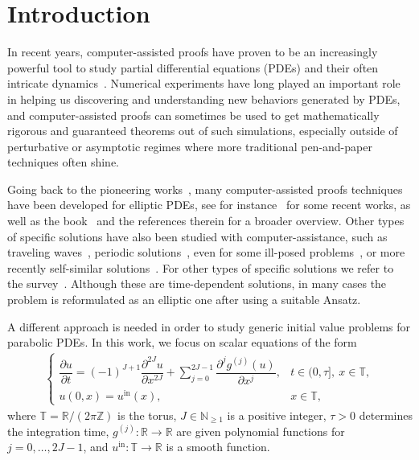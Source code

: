 \documentclass[10pt,a4paper]{article}
\theoremstyle{plain}
\newcommand{\RR}{\mathbb R}
\newcommand{\ZZ}{\mathbb Z}
\newcommand{\TT}{\mathbb T}
\newcommand{\NN}{\mathbb N}
\newcommand{\1}{\mathbf{1}}
\newcommand{\uin}{{u^{\mathrm{in}}}}
\begin{document}


\section{Introduction}
\label{sec:introduction}

In recent years, computer-assisted proofs have proven to be an increasingly powerful tool to study partial differential equations (PDEs) and their often intricate dynamics~\cite{BerLes15}. Numerical experiments have long played an important role in helping us
discovering and understanding new behaviors generated by PDEs, and computer-assisted proofs can sometimes be used to get mathematically rigorous and guaranteed theorems out of such simulations, especially outside of perturbative or asymptotic regimes where more traditional pen-and-paper techniques often shine. 

Going back to the pioneering works~\cite{Nak88,Plu92}, many computer-assisted proofs techniques have been developed for elliptic PDEs, see for instance~\cite{BerWil19,AriGazKoc21,LiuNakOis22,Wun22,CadLesNav24} for some recent works, as well as the book~\cite{NakPluWat19} and the references therein for a broader overview. Other types of specific solutions have also been studied with computer-assistance, such as traveling waves~\cite{AriKoc15,BreHorMcKPlu06,BerBreLesMur18,EncGomVer18,BerShe20,Cad24}, periodic solutions~\cite{Zgl04,AriKoc10bis,GamLes17,FigLla17,BerBreLesVee21}, even for some ill-posed problems~\cite{CasGamLes18}, or more recently self-similar solutions~\cite{BucCaoGom22,CheHou25,BreChu24,DahFig24,DonSch24,HouWanYan25}. For other types of specific solutions we refer to the survey~\cite{Gom19}. Although these are time-dependent solutions, in many cases the problem is reformulated as an elliptic one after using a suitable Ansatz.

A different approach is needed in order to study generic initial value problems for parabolic PDEs. In this work, we focus on scalar equations of the form
\begin{align}
	\begin{cases}
		\dfrac{ \partial u}{ \partial t} = 
		(-1)^{J+1} \dfrac{ \partial^{2J} u}{ \partial x^{2J}} + \displaystyle\sum_{j=0}^{2J-1} \dfrac{\partial^{j} g^{(j)} (u)}{\partial x^j} ,
		& t \in (0,\tau], \ x \in \TT, \\[2ex]
		u (0, x) = u^{\mathrm{in}} ( x ), & x \in \TT, 
	\end{cases}
	\label{eq:PDE}
\end{align}
where $\TT = \RR/(2\pi\ZZ)$ is the torus, $J\in\NN_{\geq 1}$ is a positive integer, $\tau>0$ determines the integration time, $g^{(j)}:\RR\to\RR$ are given polynomial functions for $j=0,\ldots,2J-1$, and $\uin: \TT \rightarrow \RR$ is a smooth function. 
\end{document}
